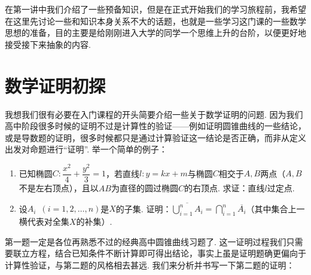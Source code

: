 \newcommand{\suc}{\operatorname{suc}}

在第一讲中我们介绍了一些预备知识，但是在正式开始我们的学习旅程前，我希望在这里先讨论一些和知识本身关系不大的话题，也就是一些学习这门课的一些数学思想的准备，目的主要是给刚刚进入大学的同学一个思维上升的台阶，以便更好地接受接下来抽象的内容.

\section{数学证明初探}

我想我们很有必要在入门课程的开头简要介绍一些关于数学证明的问题. 因为我们高中阶段很多时候的证明不过是计算性的验证——例如证明圆锥曲线的一些结论，或是导数题的证明，很多时候都只是通过计算验证这一结论是否正确，而非从定义出发对命题进行``证明''. 举一个简单的例子：

\begin{example}{}{}
    \begin{enumerate}
        \item 已知椭圆$C:\dfrac{x^2}{4}+\dfrac{y^2}{3}=1$，若直线$l\colon y=kx+m$与椭圆$C$相交于$A,B$两点（$A,B$不是左右顶点），且以$AB$为直径的圆过椭圆$C$的右顶点. 求证：直线$l$过定点.

        \item 设$A_i\enspace(i=1,2,\ldots,n)$是$X$的子集. 证明：$\overline{\displaystyle\bigcup_{i=1}^nA_i}=\displaystyle\bigcap_{i=1}^n\overline{A_i}$（其中集合上一横代表对全集$X$的补集）.
    \end{enumerate}
\end{example}

第一题一定是各位再熟悉不过的经典高中圆锥曲线习题了. 这一证明过程我们只需要联立方程，结合已知条件不断计算即可得出结论，事实上虽是证明题确更偏向于计算性验证，与第二题的风格相去甚远. 我们来分析并书写一下第二题的证明：

